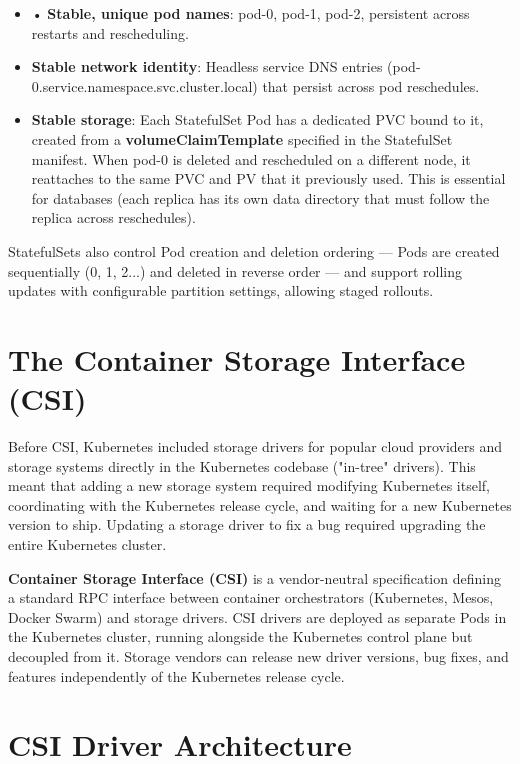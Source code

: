 \begin{itemize}
  \item • \textbf{Stable, unique pod names}: pod-0, pod-1, pod-2, persistent across restarts and rescheduling.
  \item \textbf{Stable network identity}: Headless service DNS entries (pod-0.service.namespace.svc.cluster.local) that persist across pod reschedules.
  \item \textbf{Stable storage}: Each StatefulSet Pod has a dedicated PVC bound to it, created from a \textbf{volumeClaimTemplate} specified in the StatefulSet manifest. When pod-0 is deleted and rescheduled on a different node, it reattaches to the same PVC and PV that it previously used. This is essential for databases (each replica has its own data directory that must follow the replica across reschedules).
\end{itemize}

StatefulSets also control Pod creation and deletion ordering --- Pods are created sequentially (0, 1, 2...) and deleted in reverse order --- and support rolling updates with configurable partition settings, allowing staged rollouts.

\section{The Container Storage Interface (CSI)}
Before CSI, Kubernetes included storage drivers for popular cloud providers and storage systems directly in the Kubernetes codebase ("in-tree" drivers). This meant that adding a new storage system required modifying Kubernetes itself, coordinating with the Kubernetes release cycle, and waiting for a new Kubernetes version to ship. Updating a storage driver to fix a bug required upgrading the entire Kubernetes cluster.

\textbf{Container Storage Interface (CSI)} is a vendor-neutral specification defining a standard RPC interface between container orchestrators (Kubernetes, Mesos, Docker Swarm) and storage drivers. CSI drivers are deployed as separate Pods in the Kubernetes cluster, running alongside the Kubernetes control plane but decoupled from it. Storage vendors can release new driver versions, bug fixes, and features independently of the Kubernetes release cycle.

\section{CSI Driver Architecture}

